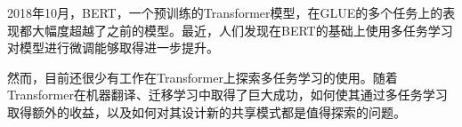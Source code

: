 2018年10月，BERT\cite{devlin2018bert}，一个预训练的Transformer模型，在GLUE的多个任务上的表现都大幅度超越了之前的模型。最近，人们发现在BERT的基础上使用多任务学习对模型进行微调能够取得进一步提升\cite{liu2019multi}\cite{anonymous2018bam!}。

然而，目前还很少有工作在Transformer上探索多任务学习的使用。随着Transformer在机器翻译\cite{DBLP:conf/nips/VaswaniSPUJGKP17}、迁移学习\cite{radford2018improving}\cite{devlin2018bert}中取得了巨大成功，如何使其通过多任务学习取得额外的收益，以及如何对其设计新的共享模式都是值得探索的问题。